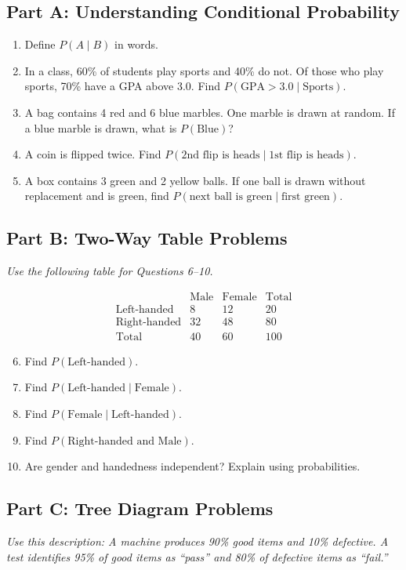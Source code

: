 \documentclass[12pt]{article}
\begin{document}
\subsection*{Part A: Understanding Conditional Probability}
\begin{enumerate}
  \item Define \(P(A\mid B)\) in words.
  \item In a class, 60\% of students play sports and 40\% do not. Of those who play sports, 70\% have a GPA above 3.0. Find \(P(\text{GPA}>3.0\mid \text{Sports})\).
  \item A bag contains 4 red and 6 blue marbles. One marble is drawn at random. If a blue marble is drawn, what is \(P(\text{Blue})\)?
  \item A coin is flipped twice. Find \(P(\text{2nd flip is heads}\mid \text{1st flip is heads})\).
  \item A box contains 3 green and 2 yellow balls. If one ball is drawn without replacement and is green, find \(P(\text{next ball is green}\mid \text{first green})\).
\end{enumerate}

\subsection*{Part B: Two-Way Table Problems}
\textit{Use the following table for Questions 6–10.}

\[
\begin{array}{c|ccc}
 & \text{Male} & \text{Female} & \text{Total} \\ \hline
\text{Left-handed} & 8 & 12 & 20\\
\text{Right-handed} & 32 & 48 & 80\\ \hline
\text{Total} & 40 & 60 & 100
\end{array}
\]

\begin{enumerate}
  \setcounter{enumi}{5}
  \item Find \(P(\text{Left-handed})\).
  \item Find \(P(\text{Left-handed}\mid \text{Female})\).
  \item Find \(P(\text{Female}\mid \text{Left-handed})\).
  \item Find \(P(\text{Right-handed and Male})\).
  \item Are gender and handedness independent? Explain using probabilities.
\end{enumerate}

\subsection*{Part C: Tree Diagram Problems}
\textit{Use this description: A machine produces 90\% good items and 10\% defective. A test identifies 95\% of good items as “pass” and 80\% of defective items as “fail.”}
\end{document}
